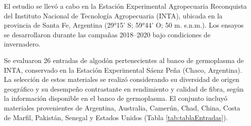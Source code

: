 \documentclass[12pt,oneside]{reedthesis}
\begin{document}
El estudio se llevó a cabo en la Estación Experimental Agropecuaria Reconquista del Instituto Nacional de Tecnología Agropecuaria (INTA), ubicada en la provincia de Santa Fe, Argentina (29°15' S; 59°44' O; 50 m. s.n.m.). Los ensayos se desarrollaron durante las campañas 2018--2020 bajo condiciones de invernadero.

Se evaluaron 26 entradas de algodón pertenecientes al banco de germoplasma de INTA, conservado en la Estación Experimental Sáenz Peña (Chaco, Argentina). La selección de estos materiales se realizó considerando su diversidad de origen geográfico y su desempeño contrastante en rendimiento y calidad de fibra, según la información disponible en el banco de germoplasma. El conjunto incluyó materiales provenientes de Argentina, Australia, Camerún, Chad, China, Costa de Marfil, Pakistán, Senegal y Estados Unidos (Tabla \ref{tab:tablaEntradas}).

\begin{table}[!h]
\centering
\caption{\label{tab:tablaEntradas}Entradas de \emph{Gossypium hirsutum} L. usadas en el presente estudio y su procedencia}
\centering
{}
\end{table}
\end{document}
